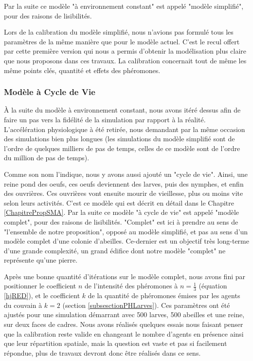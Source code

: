 			Par la suite ce modèle "à environnement constant" est appelé "modèle simplifié", pour des raisons de lisibilités.
			
			Lors de la calibration du modèle simplifié, nous n'avions pas formulé tous les paramètres de la même manière que pour le modèle actuel. C'est le recul offert par cette première version qui nous a permis d'obtenir la modélisation plus claire que nous proposons dans ces travaux. La calibration concernait tout de même les même points clés, quantité et effets des phéromones.
			
			
			\subsubsection{Modèle à Cycle de Vie}
			À la suite du modèle à environnement constant, nous avons itéré dessus afin de faire un pas vers la fidélité de la simulation par rapport à la réalité. L'accélération physiologique à été retirée, nous demandant par la même occasion des simulations bien plus longues (les simulations du modèle simplifié sont de l'ordre de quelques milliers de pas de temps, celles de ce modèle sont de l'ordre du million de pas de temps).
			
			Comme son nom l'indique, nous y avons aussi ajouté un "cycle de vie". Ainsi, une reine pond des oeufs, ces oeufs deviennent des larves, puis des nymphes, et enfin des ouvrières. Ces ouvrières vont ensuite mourir de vieillesse, plus ou moins vite selon leurs activités. C'est ce modèle qui est décrit en détail dans le Chapitre \ref{ChapitrePropSMA}.
			Par la suite ce modèle "à cycle de vie" est appelé "modèle complet", pour des raisons de lisibilités. "Complet" est ici à prendre au sens de "l'ensemble de notre proposition", opposé au modèle simplifié, et pas au sens d'un modèle complet d'une colonie d'abeilles. Ce-dernier est un objectif très long-terme d'une grande complexité, un grand édifice dont notre modèle "complet" ne représente qu'une pierre.
			
			Après une bonne quantité d'itérations sur le modèle complet, nous avons fini par positionner le coefficient $n$ de l'intensité des phéromones à $n = \frac{1}{3}$ (équation \ref{hjRED}), et le coefficient $k$ de la quantité de phéromones émises par les agents du couvain à $k=2$ (section \ref{subsesctionPHLarves}). Ces paramètres ont été ajustés pour une simulation démarrant avec 500 larves, 500 abeilles et une reine, sur deux faces de cadres. Nous avons réalisés quelques essais nous faisant penser que la calibration reste valide en changeant le nombre d'agents en présence ainsi que leur répartition spatiale, mais la question est vaste et pas si facilement répondue, plus de travaux devront donc être réalisés dans ce sens.
		
